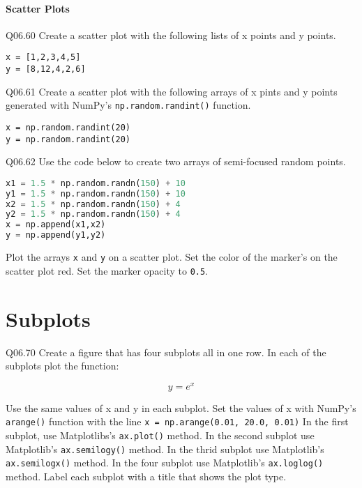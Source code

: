 \documentclass{book}
\newcommand{\passthrough}[1]{#1}
\begin{document}
    
        \hypertarget{scatter-plots}{%
\subsubsection{Scatter Plots}\label{scatter-plots}}

Q06.60 Create a scatter plot with the following lists of x points and y
points.

\begin{lstlisting}
x = [1,2,3,4,5]
y = [8,12,4,2,6]
\end{lstlisting}

Q06.61 Create a scatter plot with the following arrays of x pints and y
points generated with NumPy's
\passthrough{\lstinline!np.random.randint()!} function.

\begin{lstlisting}
x = np.random.randint(20)
y = np.random.randint(20)
\end{lstlisting}

Q06.62 Use the code below to create two arrays of semi-focused random
points.

\begin{lstlisting}[language=Python]
x1 = 1.5 * np.random.randn(150) + 10
y1 = 1.5 * np.random.randn(150) + 10
x2 = 1.5 * np.random.randn(150) + 4
y2 = 1.5 * np.random.randn(150) + 4
x = np.append(x1,x2)
y = np.append(y1,y2)
\end{lstlisting}

Plot the arrays \passthrough{\lstinline!x!} and
\passthrough{\lstinline!y!} on a scatter plot. Set the color of the
marker's on the scatter plot red. Set the marker opacity to
\passthrough{\lstinline!0.5!}.
    




    
        \hypertarget{subplots}{%
\chapter{Subplots}\label{subplots}}

Q06.70 Create a figure that has four subplots all in one row. In each of
the subplots plot the function:

\[ y = e^x \]

Use the same values of x and y in each subplot. Set the values of x with
NumPy's \passthrough{\lstinline!arange()!} function with the line
\passthrough{\lstinline!x = np.arange(0.01, 20.0, 0.01)!} In the first
subplot, use Matplotlibs's \passthrough{\lstinline!ax.plot()!} method.
In the second subplot use Matplotlib's
\passthrough{\lstinline!ax.semilogy()!} method. In the thrid subplot use
Matplotlib's \passthrough{\lstinline!ax.semilogx()!} method. In the four
subplot use Matplotlib's \passthrough{\lstinline!ax.loglog()!} method.
Label each subplot with a title that shows the plot type.
\end{document}
